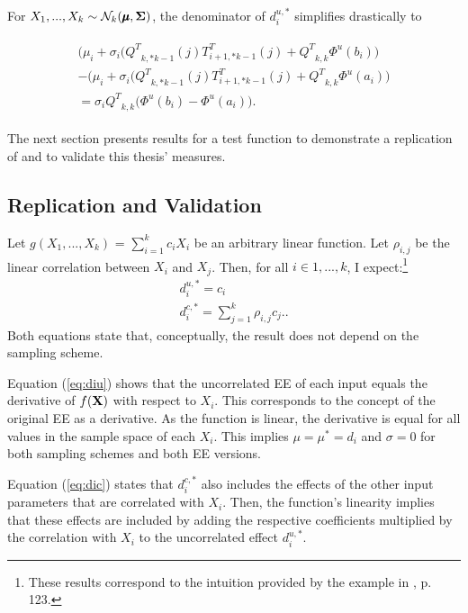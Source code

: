 \documentclass[a4paper,12pt]{article}
\begin{document}
For $X_1, ..., X_k \sim \mathcal{N}_k(\pmb{\mu}, \bold{\Sigma})$, the denominator of $d_i^{u,*}$ simplifies drastically to

\begin{align}
\begin{split}
 \big(\mu_i + \sigma_i\big({Q^T}_{k,*k-1}(j)T_{i+1,*k-1}^T(j) + {Q^T}_{k,k} \Phi^u(b_i)\big) \\-  \big(\mu_i + \sigma_i\big({Q^T}_{k,*k-1}(j)T_{i+1,*k-1}^T(j) + {Q^T}_{k,k} \Phi^u(a_i)\big)\\= \sigma_i{Q^T}_{k,k}\big(\Phi^u(b_i)-\Phi^u(a_i)\big).
 \end{split}
\end{align}

\noindent
The next section presents results for a test function to demonstrate a replication of \cite{ge2017extending} and to validate this thesis' measures.

\subsection{Replication and Validation}

Let $g(X_1, ..., X_k)$ = $\sum_{i = 1}^{k} c_i X_i$ be an arbitrary linear function. Let $\rho_{i,j}$ be the linear correlation between $X_i$ and $X_j$. Then, for all $i \in 1, ..., k$, I expect:\footnote{These results correspond to the intuition provided by the example in \cite{Saltelli.2008}, p. 123.}
\begin{align}
d_i^{u,*} = c_i \label{eq:diu}\\
d_i^{c,*} = \sum_{j = 1}^{k} \rho_{i,j} c_{j}. \label{eq:dic}.
\end{align}
Both equations state that, conceptually, the result does not depend on the sampling scheme.

Equation (\ref{eq:diu}) shows that the uncorrelated EE of each input equals the derivative of $f(\bold{X})$ with respect to $X_i$. This corresponds to the concept of the original EE as a derivative. As the function is linear, the derivative is equal for all values in the sample space of each $X_i$. This implies $\mu=\mu^*=d_i $ and $ \sigma=0$ for both sampling schemes and both EE versions.

Equation (\ref{eq:dic}) states that $d_i^{c,*}$ also includes the effects of the other input parameters that are correlated with $X_i$. Then, the function's linearity implies that these effects are included by adding the respective coefficients multiplied by the correlation with $X_i$ to the uncorrelated effect $d_i^{u,*}$.\\
\end{document}
